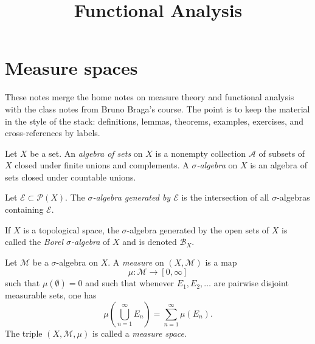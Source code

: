 



\title{Functional Analysis}
\maketitle
{}
\label{section-phantom-functional-analysis}

\tableofcontents

\section{Measure spaces}
\label{section-measure-spaces}

\noindent These notes merge the home notes on
measure theory and functional analysis with
the class notes from Bruno Braga's course.
The point is to keep the material in the
style of the stack: definitions, lemmas,
theorems, examples, exercises, and
cross-references by labels.

\begin{definition}
\label{definition-sigma-algebra}
Let $X$ be a set. An {\it algebra of sets} on
$X$ is a nonempty collection $\mathcal A$ of
subsets of $X$ closed under finite unions and
complements. A {\it $\sigma$-algebra} on $X$
is an algebra of sets closed under countable
unions.
\end{definition}

\begin{definition}
\label{definition-generated-sigma-algebra}
Let $\mathcal E \subset \mathcal P(X)$. The
{\it $\sigma$-algebra generated by $\mathcal
E$} is the intersection of all
$\sigma$-algebras containing $\mathcal E$.
\end{definition}

\begin{definition}
\label{definition-borel-algebra}
If $X$ is a topological space, the
$\sigma$-algebra generated by the open sets
of $X$ is called the {\it Borel
$\sigma$-algebra} of $X$ and is denoted
$\mathcal B_X$.
\end{definition}

\begin{definition}
\label{definition-measure}
Let $\mathcal M$ be a $\sigma$-algebra on
$X$. A {\it measure} on $(X,\mathcal M)$ is a
map
$$
\mu : \mathcal M \longrightarrow [0,\infty]
$$
such that $\mu(\emptyset)=0$ and such that
whenever $E_1,E_2,\ldots$ are pairwise
disjoint measurable sets, one has
$$
\mu\left(\bigcup_{n=1}^\infty E_n\right) =
\sum_{n=1}^\infty \mu(E_n).
$$
The triple $(X,\mathcal M,\mu)$ is called a
{\it measure space}.
\end{definition}

